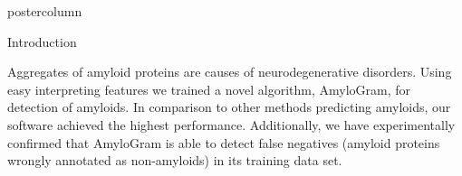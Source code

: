 \documentclass[final]{beamer}\usepackage[]{graphicx}\usepackage[]{color}
\newlength{\columnheight}
\begin{document}
\begin{frame}
\begin{columns}
\begin{column}{.53\textwidth}
\begin{beamercolorbox}[center,wd=\textwidth]{postercolumn}
\begin{minipage}[T]{.95\textwidth}
\parbox[t][\columnheight]{\textwidth}
{
\begin{block}{Introduction}


Aggregates of amyloid proteins are causes of neurodegenerative disorders. Using easy interpreting features we trained a novel algorithm, AmyloGram, for detection of amyloids. In comparison to other methods predicting amyloids, our software achieved the highest performance. Additionally, we have experimentally confirmed that AmyloGram is able to detect false negatives (amyloid proteins wrongly annotated as non-amyloids) in its training data set.

    \end{block}

}
\end{minipage}
\end{beamercolorbox}
\end{column}
\end{columns}
\end{frame}
\end{document}
